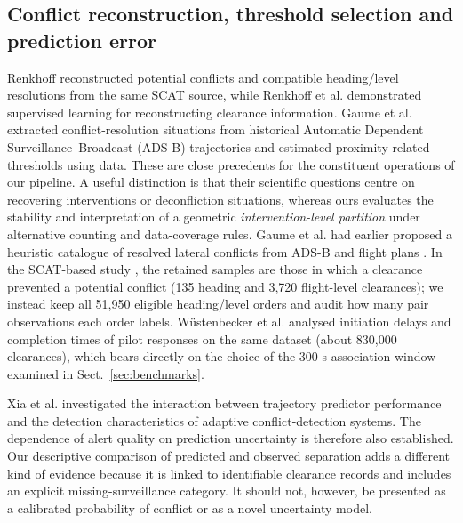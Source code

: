 \documentclass[pdflatex,sn-mathphys-num]{sn-jnl}
\begin{document}
\subsection{Conflict reconstruction, threshold selection and prediction error}
Renkhoff \cite{renkhoff2025} reconstructed potential conflicts and compatible heading/level resolutions from the same SCAT source, while Renkhoff et al. \cite{renkhoff2026} demonstrated supervised learning for reconstructing clearance information. Gaume et al. \cite{gaume2025} extracted conflict-resolution situations from historical Automatic Dependent Surveillance--Broadcast (ADS-B) trajectories and estimated proximity-related thresholds using data. These are close precedents for the constituent operations of our pipeline. A useful distinction is that their scientific questions centre on recovering interventions or deconfliction situations, whereas ours evaluates the stability and interpretation of a geometric \emph{intervention-level partition} under alternative counting and data-coverage rules. Gaume et al. had earlier proposed a heuristic catalogue of resolved lateral conflicts from ADS-B and flight plans \cite{gaume2023}. In the SCAT-based study \cite{renkhoff2025}, the retained samples are those in which a clearance prevented a potential conflict (135 heading and 3,720 flight-level clearances); we instead keep all 51,950 eligible heading/level orders and audit how many pair observations each order labels. Wüstenbecker et al. \cite{wustenbecker2025} analysed initiation delays and completion times of pilot responses on the same dataset (about 830,000 clearances), which bears directly on the choice of the 300-s association window examined in Sect.~\ref{sec:benchmarks}.

Xia et al. \cite{xia2024} investigated the interaction between trajectory predictor performance and the detection characteristics of adaptive conflict-detection systems. The dependence of alert quality on prediction uncertainty is therefore also established. Our descriptive comparison of predicted and observed separation adds a different kind of evidence because it is linked to identifiable clearance records and includes an explicit missing-surveillance category. It should not, however, be presented as a calibrated probability of conflict or as a novel uncertainty model.
\end{document}
